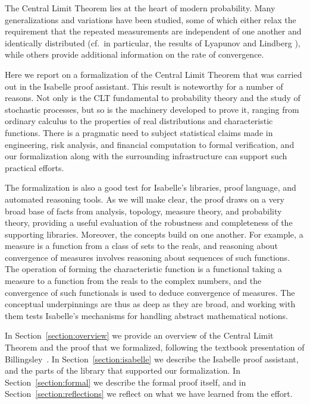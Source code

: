 \documentclass{svjour3}
\begin{document}
The Central Limit Theorem lies at the heart of modern probability. Many generalizations and variations have been studied, some of which either relax the requirement that the repeated measurements are independent of one another and identically distributed (cf.~in particular, the results of Lyapunov and Lindberg \cite{billingsley:95}), while others provide additional information on the rate of convergence.

Here we report on a formalization of the Central Limit Theorem that was carried out in the Isabelle proof assistant. This result is noteworthy for a number of reasons. Not only is the CLT fundamental to probability theory and the study of stochastic processes, but so is the machinery developed to prove it, ranging from ordinary calculus to the properties of real distributions and characteristic functions. There is a pragmatic need to subject statistical claims made in engineering, risk analysis, and financial computation to formal verification, and our formalization along with the surrounding infrastructure can support such practical efforts.

The formalization is also a good test for Isabelle's libraries, proof language, and automated reasoning tools. As we will make clear, the proof draws on a very broad base of facts from analysis, topology, measure theory, and probability theory, providing a useful evaluation of the robustness and completeness of the supporting libraries. Moreover, the concepts build on one another. For example, a measure is a function from a class of sets to the reals, and reasoning about convergence of measures involves reasoning about sequences of such functions. The operation of forming the characteristic function is a functional taking a measure to a function from the reals to the complex numbers, and the convergence of such functionals is used to deduce convergence of measures. The conceptual underpinnings are thus as deep as they are broad, and working with them tests Isabelle's mechanisms for handling abstract mathematical notions.

In Section~\ref{section:overview} we provide an overview of the Central Limit Theorem and the proof that we formalized, following the textbook presentation of Billingsley~\cite{billingsley:95}. In Section~\ref{section:isabelle} we describe the Isabelle proof assistant, and the parts of the library that supported our formalization. In Section~\ref{section:formal} we describe the formal proof itself, and in Section~\ref{section:reflections} we reflect on what we have learned from the effort.
\end{document}
